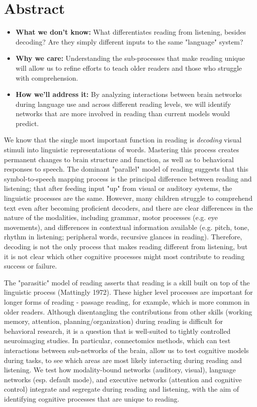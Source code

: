 \chapter{Abstract}

\begin{itemize}
	\item \textbf{What we don't know:} What differentiates reading from listening, besides decoding? Are they simply different inputs to the same "language" system?
	\item \textbf{Why we care:} Understanding the sub-processes that make reading unique will allow us to refine efforts to teach older readers and those who struggle with comprehension.
	\item \textbf{How we'll address it:} By analyzing interactions between brain networks during language use and across different reading levels, we will identify networks that are more involved in reading than current models would predict. 
\end{itemize}

We know that the single most important function in reading is \textit{decoding} visual stimuli into linguistic representations of words. Mastering this process creates permanent changes to brain structure and function, as well as to behavioral responses to speech. The dominant "parallel" model of reading suggests that this symbol-to-speech mapping process is the principal difference between reading and listening; that after feeding input "up" from visual or auditory systems, the linguistic processes are the same. However, many children struggle to comprehend text even after becoming proficient decoders, and there are clear differences in the nature of the modalities, including grammar, motor processes (e.g. eye movements), and differences in contextual information available (e.g. pitch, tone, rhythm in listening; peripheral words, recursive glances in reading). Therefore, decoding is not the only process that makes reading different from listening, but it is not clear which other cognitive processes might most contribute to reading success or failure. 

The "parasitic" model of reading asserts that reading is a skill built on top of the linguistic process (Mattingly 1972). These higher level processes are important for longer forms of reading - passage reading, for example, which is more common in older readers. Although disentangling the contributions from other skills (working memory, attention, planning/organization) during reading is difficult for behavioral research, it is a question that is well-suited to tightly controlled neuroimaging studies. In particular, connectomics methods, which can test interactions between sub-networks of the brain, allow us to test cognitive models during tasks, to see which areas are most likely interacting during reading and listening. We test how modality-bound networks (auditory, visual), language networks (esp. default mode), and executive networks (attention and cognitive control) integrate and segregate during reading and listening, with the aim of identifying cognitive processes that are unique to reading.

